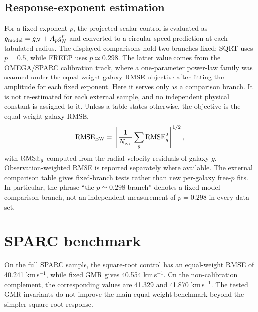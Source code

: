 ﻿\documentclass[twocolumn]{aastex631}
\newcommand{\kms}{km\,s$^{-1}$}
\begin{document}
\subsection{Response-exponent estimation}
For a fixed exponent $p$, the projected scalar control is evaluated as $g_{\rm model}=g_N+A_p g_N^p$ and converted to a circular-speed prediction at each tabulated radius.  The displayed comparisons hold two branches fixed: SQRT uses $p=0.5$, while FREEP uses $p\simeq0.298$.  The latter value comes from the OMEGA/SPARC calibration track, where a one-parameter power-law family was scanned under the equal-weight galaxy RMSE objective after fitting the amplitude for each fixed exponent.  Here it serves only as a comparison branch.  It is not re-estimated for each external sample, and no independent physical constant is assigned to it.  Unless a table states otherwise, the objective is the equal-weight galaxy RMSE,
\begin{equation}
{\rm RMSE}_{\rm EW}=\left[\frac{1}{N_{\rm gal}}\sum_g {\rm RMSE}_g^2\right]^{1/2},
\end{equation}
with ${\rm RMSE}_g$ computed from the radial velocity residuals of galaxy $g$.  Observation-weighted RMSE is reported separately where available.  The external comparison table gives fixed-branch tests rather than new per-galaxy free-$p$ fits.  In particular, the phrase ``the $p\simeq0.298$ branch'' denotes a fixed model-comparison branch, not an independent measurement of $p=0.298$ in every data set.

\section{SPARC benchmark}
On the full SPARC sample, the square-root control has an equal-weight RMSE of 40.241 \kms, while fixed GMR gives 40.554 \kms.  On the non-calibration complement, the corresponding values are 41.329 and 41.870 \kms.  The tested GMR invariants do not improve the main equal-weight benchmark beyond the simpler square-root response.
\end{document}
